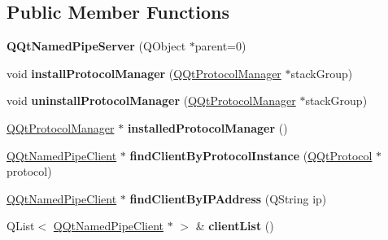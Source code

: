 \subsection*{Public Member Functions}
\begin{DoxyCompactItemize}
\item 
\mbox{\label{class_q_qt_named_pipe_server_a4869222d1de15554e0cf7c763b49cb3e}} 
{\bfseries Q\+Qt\+Named\+Pipe\+Server} (Q\+Object $\ast$parent=0)
\item 
\mbox{\label{class_q_qt_named_pipe_server_a916e7663d537547db3f35d64a6cd82db}} 
void {\bfseries install\+Protocol\+Manager} (\mbox{\hyperlink{class_q_qt_protocol_manager}{Q\+Qt\+Protocol\+Manager}} $\ast$stack\+Group)
\item 
\mbox{\label{class_q_qt_named_pipe_server_a0599916d7b3e361c31319904f257ecad}} 
void {\bfseries uninstall\+Protocol\+Manager} (\mbox{\hyperlink{class_q_qt_protocol_manager}{Q\+Qt\+Protocol\+Manager}} $\ast$stack\+Group)
\item 
\mbox{\label{class_q_qt_named_pipe_server_a798444628daebd62a77d2edb69f4d80a}} 
\mbox{\hyperlink{class_q_qt_protocol_manager}{Q\+Qt\+Protocol\+Manager}} $\ast$ {\bfseries installed\+Protocol\+Manager} ()
\item 
\mbox{\label{class_q_qt_named_pipe_server_a5da0b038ee3f0ae0dc809a94a5f2237e}} 
\mbox{\hyperlink{class_q_qt_named_pipe_client}{Q\+Qt\+Named\+Pipe\+Client}} $\ast$ {\bfseries find\+Client\+By\+Protocol\+Instance} (\mbox{\hyperlink{class_q_qt_protocol}{Q\+Qt\+Protocol}} $\ast$protocol)
\item 
\mbox{\label{class_q_qt_named_pipe_server_abfa20d03222cce57ece9be0e00c7d6cb}} 
\mbox{\hyperlink{class_q_qt_named_pipe_client}{Q\+Qt\+Named\+Pipe\+Client}} $\ast$ {\bfseries find\+Client\+By\+I\+P\+Address} (Q\+String ip)
\item 
\mbox{\label{class_q_qt_named_pipe_server_ac7add942bc5e2999aae4543fa20f85b9}} 
Q\+List$<$ \mbox{\hyperlink{class_q_qt_named_pipe_client}{Q\+Qt\+Named\+Pipe\+Client}} $\ast$ $>$ \& {\bfseries client\+List} ()
\end{DoxyCompactItemize}


